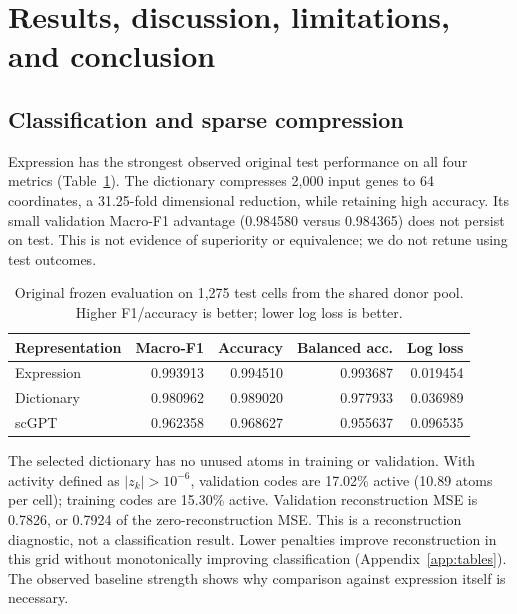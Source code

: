 \section{Results, discussion, limitations, and conclusion}
\subsection{Classification and sparse compression}
Expression has the strongest observed original test performance on all four
metrics (Table~\ref{tab:test}). The dictionary compresses 2,000 input genes to
64 coordinates, a 31.25-fold dimensional reduction, while retaining high
accuracy. Its small validation Macro-F1 advantage (0.984580 versus 0.984365)
does not persist on test. This is not evidence of superiority or equivalence;
we do not retune using test outcomes.
\begin{table}[htbp]\centering
\caption{Original frozen evaluation on 1,275 test cells from the shared donor
pool. Higher F1/accuracy is better; lower log loss is better.}
\label{tab:test}
\begin{tabular}{lrrrr}\toprule
Representation & Macro-F1 & Accuracy & Balanced acc. & Log loss\\\midrule
Expression & 0.993913 & 0.994510 & 0.993687 & 0.019454\\
Dictionary & 0.980962 & 0.989020 & 0.977933 & 0.036989\\
scGPT & 0.962358 & 0.968627 & 0.955637 & 0.096535\\\bottomrule
\end{tabular}
\end{table}

The selected dictionary has no unused atoms in training or validation.
With activity defined as $|z_k|>10^{-6}$, validation codes are 17.02\% active
(10.89 atoms per cell); training codes are 15.30\% active. Validation
reconstruction MSE is 0.7826, or 0.7924 of the zero-reconstruction MSE.
This is a reconstruction diagnostic, not a classification result. Lower
penalties improve reconstruction in this grid without monotonically improving
classification (Appendix~\ref{app:tables}). The observed baseline strength
shows why comparison against expression itself is necessary.

